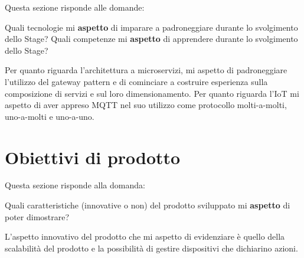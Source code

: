 Questa sezione risponde alle domande:

Quali tecnologie mi \textbf{aspetto} di imparare a padroneggiare durante lo svolgimento dello Stage?
Quali competenze mi \textbf{aspetto} di apprendere durante lo svolgimento dello Stage?

Per quanto riguarda l'architettura a microservizi, mi aspetto di padroneggiare l'utilizzo del gateway pattern e di cominciare a costruire esperienza sulla composizione di servizi e sul loro dimensionamento.
Per quanto riguarda l'IoT mi aspetto di aver appreso MQTT nel suo utilizzo come protocollo molti-a-molti, uno-a-molti e uno-a-uno.

\section{Obiettivi di prodotto}

Questa sezione risponde alla domanda:

Quali caratteristiche (innovative o non) del prodotto sviluppato mi \textbf{aspetto} di poter dimostrare?

L'aspetto innovativo del prodotto che mi aspetto di evidenziare è quello della scalabilità del prodotto e la possibilità di gestire dispositivi che dichiarino azioni.
